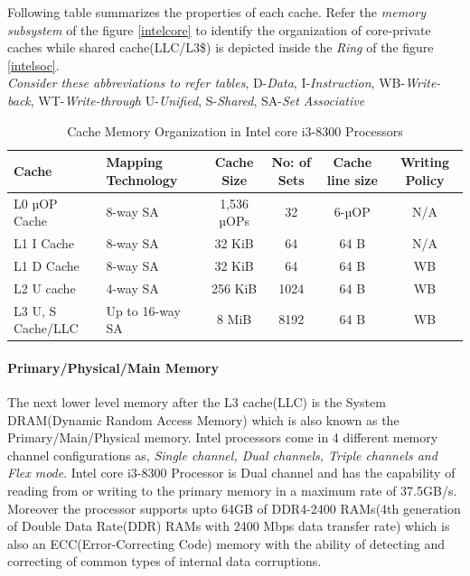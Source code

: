 \documentclass[a4paper,11pt]{article}
\begin{document}
 Following table summarizes the properties of each cache. Refer the \textit{memory subsystem} of the figure \ref{intelcore} to identify the organization of core-private caches while shared cache(LLC/L3\$) is depicted inside the \textit{Ring} of the figure \ref{intelsoc}.\\

{\footnotesize \textit{Consider these abbreviations to refer tables},
D-\textit{Data}, I-\textit{Instruction}, WB-\textit{Write-back}, WT-\textit{Write-through} U-\textit{Unified}, S-\textit{Shared}, SA-\textit{Set Associative}}

 \begin{table}[!h]
	\centering
	\begin{tabular}{l| l |c |c |c|c}
		Cache  & Mapping Technology &Cache Size & No: of Sets&Cache line size& Writing Policy\\
		\hline
		L0 µOP Cache&8-way SA&1,536 µOPs&32&6-µOP&	N/A\\
		L1 I Cache &8-way SA&32 KiB&64&64 B&N/A\\
		L1 D Cache&8-way SA&32 KiB&64&64 B&WB\\
		L2 U cache&4-way SA&256 KiB&1024&64 B&WB\\
		L3 U, S Cache/LLC&Up to 16-way SA&8 MiB&8192&64 B&WB\\
		\hline\hline
	\end{tabular}
	\caption{Cache Memory Organization in Intel core i3-8300 Processors}
\end{table}

\paragraph{Primary/Physical/Main Memory}
The next lower level memory after the L3 cache(LLC) is the System DRAM(Dynamic Random Access Memory) which is also known as the Primary/Main/Physical memory. Intel processors come in 4 different memory channel configurations as, \textit{Single channel, Dual channels, Triple channels and Flex mode}. Intel core i3-8300 Processor is Dual channel and has the capability of reading from or writing to the primary memory in a maximum rate of  37.5GB/s. Moreover the processor supports upto 64GB of DDR4-2400 RAMs(4th generation of Double Data Rate(DDR) RAMs with 2400 Mbps data transfer rate) which is also an ECC(Error-Correcting Code) memory with the ability of detecting and correcting of common types of internal data corruptions.
\end{document}
